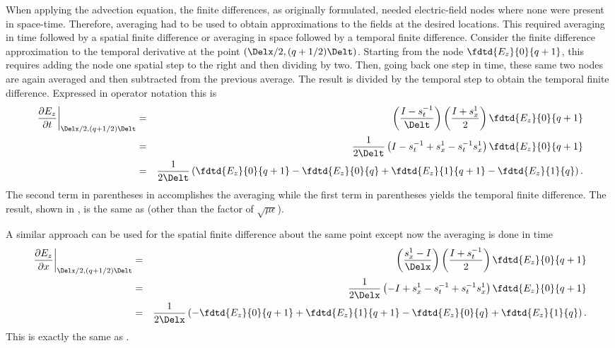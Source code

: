 When applying the advection equation, the finite differences, as
originally formulated, needed electric-field nodes where none were
present in space-time.  Therefore, averaging had to be used to obtain
approximations to the fields at the desired locations.  This required
averaging in time followed by a spatial finite difference or averaging
in space followed by a temporal finite difference.  Consider the
finite difference approximation to the temporal derivative at the
point $(\Delx/2,(q+1/2)\Delt)$.  Starting from the node
$\fdtd{E_z}{0}{q+1}$, this requires adding the node one spatial step
to the right and then dividing by two.  Then, going back one step in
time, these same two nodes are again averaged and then subtracted from
the previous average.  The result is divided by the temporal step to
obtain the temporal finite difference.  Expressed in operator notation
this is
\begin{eqnarray}
  \left.\frac{\partial E_z}{\partial t}\right|_{\Delx/2,(q+1/2)\Delt}
  &=& 
    \left(\frac{I-s_t^{-1}}{\Delt}\right)
    \left(\frac{I+s_x^{1}}{2}\right)\fdtd{E_z}{0}{q+1} 
    \label{eq:operatorDetails}
 \\
  &=&
    \frac{1}{2\Delt}
    \left(I - s_t^{-1} + s_x^{1} - s_t^{-1}s_x^{1}\right)\fdtd{E_z}{0}{q+1} \\
  &=&
    \frac{1}{2\Delt}
    \left(\fdtd{E_z}{0}{q+1} - \fdtd{E_z}{0}{q}
        + \fdtd{E_z}{1}{q+1} - \fdtd{E_z}{1}{q}\right).
    \label{eq:operatorDetailsII}
\end{eqnarray}
The second term in parentheses in 
accomplishes the averaging while the first term in parentheses yields
the temporal finite difference.  The result, shown in
, is the same as 
(other than the factor of $\sqrt{\mu\epsilon}$).

A similar approach can be used for the spatial finite difference about
the same point except now the averaging is done in time
\begin{eqnarray}
  \left.\frac{\partial E_z}{\partial x}\right|_{\Delx/2,(q+1/2)\Delt}
  &=& 
    \left(\frac{s_x^{1}-I}{\Delx}\right)
    \left(\frac{I+s_t^{-1}}{2}\right)\fdtd{E_z}{0}{q+1} 
    \label{eq:operatorDetailsIII}
 \\
  &=&
    \frac{1}{2\Delx}
    \left(-I + s_x^{1} - s_t^{-1} + s_t^{-1}s_x^{1}\right)\fdtd{E_z}{0}{q+1} \\
  &=&
    \frac{1}{2\Delx}
    \left(-\fdtd{E_z}{0}{q+1} + \fdtd{E_z}{1}{q+1}
        - \fdtd{E_z}{0}{q} + \fdtd{E_z}{1}{q}\right).
\end{eqnarray}
This is exactly the same as .

